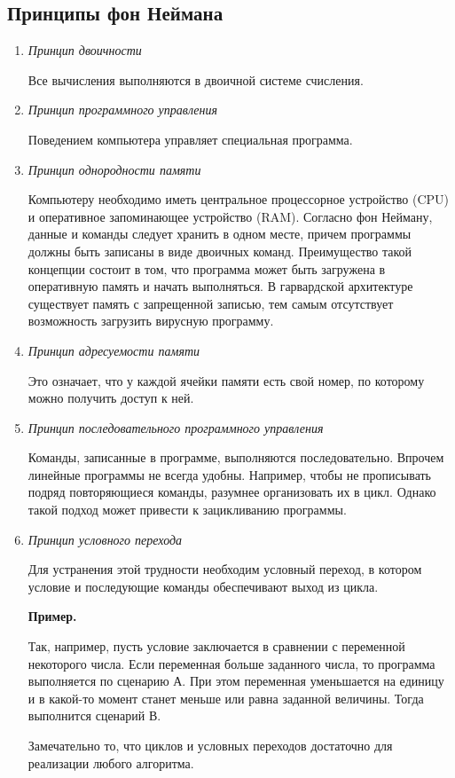 \documentclass[a4paper, fleqn]{article}
\newenvironment{example}[1][]{\medskip \noindent \textbf{Пример. #1}\par \nopagebreak}{\medskip \par} %
\begin{document}
	\subsection*{Принципы фон Неймана}
		\begin {enumerate}
			\item \emph{Принцип двоичности}
			
			Все вычисления выполняются в двоичной системе счисления.
			
			\item \emph{Принцип программного управления}
			
			Поведением компьютера управляет специальная программа.
						
			\item \emph{Принцип однородности памяти}
			
			Компьютеру необходимо иметь центральное процессорное устройство (CPU) и оперативное запоминающее устройство (RAM). Согласно фон Нейману, данные и команды следует хранить в одном месте, причем программы должны быть записаны  в виде двоичных команд. Преимущество такой концепции состоит в том, что программа может быть загружена в оперативную память и начать выполняться.
			В гарвардской архитектуре существует память с запрещенной записью, тем самым отсутствует возможность загрузить вирусную программу.
			
			\item \emph{Принцип адресуемости памяти}
			
			Это означает, что у каждой ячейки памяти есть свой номер, по которому можно получить доступ к ней.
			
			\item \emph{Принцип последовательного программного управления} 
			
			Команды, записанные в программе, выполняются последовательно. 
			Впрочем линейные программы не всегда удобны. Например, чтобы не прописывать подряд повторяющиеся команды, разумнее организовать их в цикл.  Однако такой подход может привести к зацикливанию программы.
			
			\item \emph{Принцип условного перехода}
			
			Для устранения этой трудности необходим условный переход, в котором условие и последующие команды обеспечивают выход из цикла.
			
			\begin{example}
				Так, например, пусть условие заключается в сравнении с переменной  некоторого числа.  Если переменная больше заданного числа,  то программа выполняется по сценарию А. При этом переменная уменьшается на единицу и в какой-то момент станет меньше или равна заданной величины. Тогда выполнится сценарий В.
			\end{example}
			
			Замечательно то, что циклов и условных переходов достаточно для  реализации любого алгоритма. 
			
		\end {enumerate}
		
\end{document}
